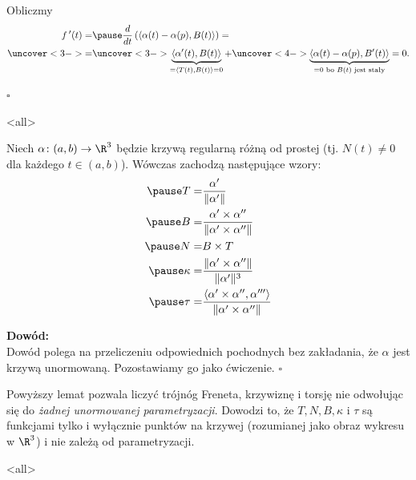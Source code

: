 \begin{frame}
Obliczmy 
\[\begin{split}
f\,'(t)=&\pause\frac{d}{dt}\left(\langle\alpha(t)-\alpha(p),B(t)\rangle\right)=\\
\uncover<3->{=}&\uncover<3->{\underbrace{\langle\alpha'(t),B(t)\rangle}_{=\langle T(t),B(t)\rangle=0}+}
\uncover<4->{\underbrace{\langle\alpha(t)-\alpha(p),B'(t) \rangle}_{=0\text{ bo $B(t)$ jest stały}}=0.}
\end{split}\]

\hfill $\square$
\end{frame}
\mode<all>{}
\begin{frame}
\begin{lemat}\label{lem_curv:wzory-ogolne}
Niech $\alpha\colon (a,b)\to \R^3$ będzie krzywą regularną r\'ożną od prostej (tj. $N(t)\neq 0$ dla każdego $t\in (a,b)$). Wówczas zachodzą następujące wzory:
\begin{align}
\pause T=& \frac{\alpha'}{\|\alpha'\|}\label{eqn:T}\\
\pause B=& \frac{\alpha'\times \alpha''}{\|\alpha'\times \alpha''\|}\label{eqn:B}\\
\pause N=& B\times T\label{eqn:N}\\
\pause \kappa=&\frac{\|\alpha'\times \alpha''\|}{\|\alpha'\|^3}\label{eqn:k}\\
\pause \tau=&\frac{\langle \alpha'\times \alpha'',\alpha'''\rangle}{\|\alpha'\times \alpha''\|}\label{eqn:t}
\end{align}

\end{lemat}
\end{frame}
\begin{frame}

\textcolor{ared}{\textbf{Dowód:}}\pause \\
Dowód  polega na przeliczeniu odpowiednich pochodnych bez zakładania, że $\alpha$ jest krzywą unormowaną. Pozostawiamy go jako ćwiczenie.
\hfill $\square$

\pause\begin{uwaga}
Powyższy lemat pozwala liczyć trójnóg Freneta, krzywiznę i torsję nie odwołując się do \textit{żadnej unormowanej parametryzacji}. Dowodzi to, że $T,N,B,\kappa$ i $\tau$ są funkcjami tylko i wyłącznie punktów na krzywej (rozumianej jako obraz wykresu w $\R^3$) i nie zależą od parametryzacji.
\end{uwaga}

\end{frame}
\mode<all> 
